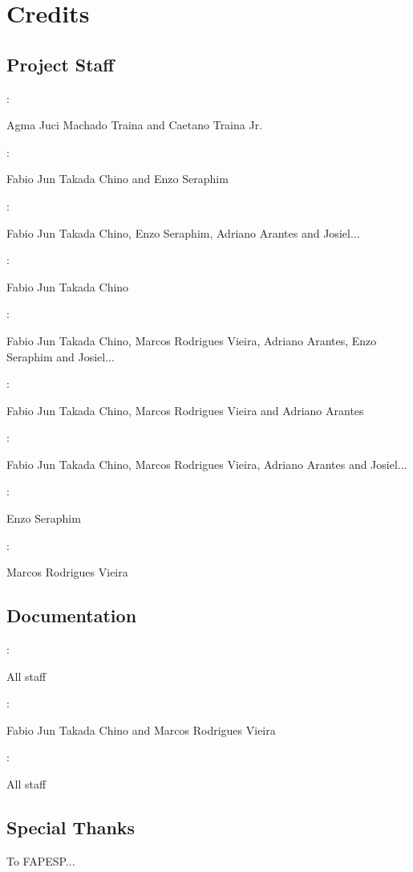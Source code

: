 \chapter{Credits}
\label{cha:credits}

\section{\libname{ }Project Staff}

:\par
Agma Juci Machado Traina and Caetano Traina Jr.

:\par
Fabio Jun Takada Chino and Enzo Seraphim

:\par
Fabio Jun Takada Chino, Enzo Seraphim, Adriano Arantes and Josiel...

:\par
Fabio Jun Takada Chino

:\par
Fabio Jun Takada Chino, Marcos Rodrigues Vieira, Adriano Arantes, Enzo Seraphim and Josiel...

:\par
Fabio Jun Takada Chino, Marcos Rodrigues Vieira and Adriano Arantes

:\par
Fabio Jun Takada Chino, Marcos Rodrigues Vieira, Adriano Arantes and Josiel...

:\par
Enzo Seraphim

:\par
Marcos Rodrigues Vieira


\section{Documentation}

:\par
All staff

:\par
Fabio Jun Takada Chino and Marcos Rodrigues Vieira

:\par
All staff

\section{Special Thanks}

To FAPESP...

